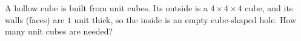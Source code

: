 A hollow cube is built from unit cubes. Its outside is a $4\times4\times4$ cube, and its walls (faces) are $1$ unit thick, so the inside is an empty cube-shaped hole. How many unit cubes are needed?
